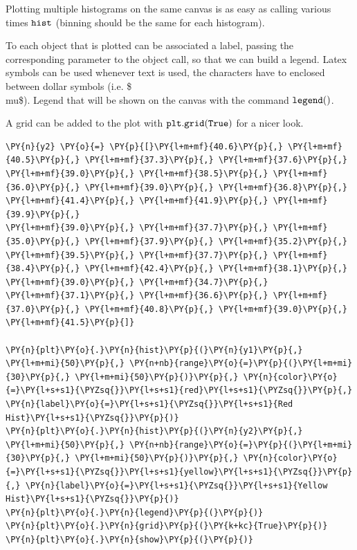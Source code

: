 Plotting multiple histograms on the same canvas is as easy as calling
various times \(\tt{hist}\) (binning should be the same for each
histogram).

To each object that is plotted can be associated a label, passing the
corresponding parameter to the object call, so that we can build a
legend. Latex symbols can be used whenever text is used, the characters
have to enclosed between dollar symbols (i.e. \$\\mu\$). Legend that
will be shown on the canvas with the command \(\tt{legend()}\).

A grid can be added to the plot with \(\tt{plt.grid(True)}\) for a nicer
look.

\begin{tcolorbox}[breakable, size=fbox, boxrule=1pt, pad at break*=1mm,colback=cellbackground, colframe=cellborder]
\begin{Verbatim}[commandchars=\\\{\}]
\PY{n}{y2} \PY{o}{=} \PY{p}{[}\PY{l+m+mf}{40.6}\PY{p}{,} \PY{l+m+mf}{40.5}\PY{p}{,} \PY{l+m+mf}{37.3}\PY{p}{,} \PY{l+m+mf}{37.6}\PY{p}{,} \PY{l+m+mf}{39.0}\PY{p}{,} \PY{l+m+mf}{38.5}\PY{p}{,} \PY{l+m+mf}{36.0}\PY{p}{,} \PY{l+m+mf}{39.0}\PY{p}{,} \PY{l+m+mf}{36.8}\PY{p}{,} \PY{l+m+mf}{41.4}\PY{p}{,} \PY{l+m+mf}{41.9}\PY{p}{,} \PY{l+m+mf}{39.9}\PY{p}{,} 
\PY{l+m+mf}{39.0}\PY{p}{,} \PY{l+m+mf}{37.7}\PY{p}{,} \PY{l+m+mf}{35.0}\PY{p}{,} \PY{l+m+mf}{37.9}\PY{p}{,} \PY{l+m+mf}{35.2}\PY{p}{,} \PY{l+m+mf}{39.5}\PY{p}{,} \PY{l+m+mf}{37.7}\PY{p}{,} \PY{l+m+mf}{38.4}\PY{p}{,} \PY{l+m+mf}{42.4}\PY{p}{,} \PY{l+m+mf}{38.1}\PY{p}{,} \PY{l+m+mf}{39.0}\PY{p}{,} \PY{l+m+mf}{34.7}\PY{p}{,} 
\PY{l+m+mf}{37.1}\PY{p}{,} \PY{l+m+mf}{36.6}\PY{p}{,} \PY{l+m+mf}{37.0}\PY{p}{,} \PY{l+m+mf}{40.8}\PY{p}{,} \PY{l+m+mf}{39.0}\PY{p}{,} \PY{l+m+mf}{41.5}\PY{p}{]}
	
\PY{n}{plt}\PY{o}{.}\PY{n}{hist}\PY{p}{(}\PY{n}{y1}\PY{p}{,} \PY{l+m+mi}{50}\PY{p}{,} \PY{n+nb}{range}\PY{o}{=}\PY{p}{(}\PY{l+m+mi}{30}\PY{p}{,} \PY{l+m+mi}{50}\PY{p}{)}\PY{p}{,} \PY{n}{color}\PY{o}{=}\PY{l+s+s1}{\PYZsq{}}\PY{l+s+s1}{red}\PY{l+s+s1}{\PYZsq{}}\PY{p}{,} \PY{n}{label}\PY{o}{=}\PY{l+s+s1}{\PYZsq{}}\PY{l+s+s1}{Red Hist}\PY{l+s+s1}{\PYZsq{}}\PY{p}{)}
\PY{n}{plt}\PY{o}{.}\PY{n}{hist}\PY{p}{(}\PY{n}{y2}\PY{p}{,} \PY{l+m+mi}{50}\PY{p}{,} \PY{n+nb}{range}\PY{o}{=}\PY{p}{(}\PY{l+m+mi}{30}\PY{p}{,} \PY{l+m+mi}{50}\PY{p}{)}\PY{p}{,} \PY{n}{color}\PY{o}{=}\PY{l+s+s1}{\PYZsq{}}\PY{l+s+s1}{yellow}\PY{l+s+s1}{\PYZsq{}}\PY{p}{,} \PY{n}{label}\PY{o}{=}\PY{l+s+s1}{\PYZsq{}}\PY{l+s+s1}{Yellow Hist}\PY{l+s+s1}{\PYZsq{}}\PY{p}{)}
\PY{n}{plt}\PY{o}{.}\PY{n}{legend}\PY{p}{(}\PY{p}{)}
\PY{n}{plt}\PY{o}{.}\PY{n}{grid}\PY{p}{(}\PY{k+kc}{True}\PY{p}{)}
\PY{n}{plt}\PY{o}{.}\PY{n}{show}\PY{p}{(}\PY{p}{)}
\end{Verbatim}
\end{tcolorbox}

